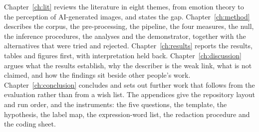 Chapter~\ref{ch:lit} reviews the literature in eight themes, from emotion theory to the perception of AI-generated images, and states the gap. Chapter~\ref{ch:method} describes the corpus, the pre-processing, the pipeline, the four measures, the null, the inference procedures, the analyses and the demonstrator, together with the alternatives that were tried and rejected. Chapter~\ref{ch:results} reports the results, tables and figures first, with interpretation held back. Chapter~\ref{ch:discussion} argues what the results establish, why the describer is the weak link, what is not claimed, and how the findings sit beside other people's work. Chapter~\ref{ch:conclusion} concludes and sets out further work that follows from the evaluation rather than from a wish list. The appendices give the repository layout and run order, and the instruments: the five questions, the template, the hypothesis, the label map, the expression-word list, the redaction procedure and the coding sheet.
